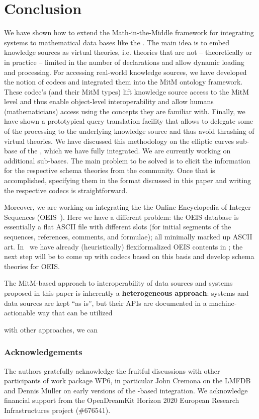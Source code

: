 \section{Conclusion}\label{sec:concl}

We have shown how to extend the Math-in-the-Middle framework for integrating systems to mathematical data bases like the \lmfdb. 
The main idea is to embed knowledge sources as virtual theories, i.e. theories that are not -- theoretically or in practice -- limited in the number of declarations and allow dynamic loading and processing. 
For accessing real-world knowledge sources, we have developed the notion of codecs and integrated them into the MitM ontology framework. 
These codec's (and their MitM types) lift knowledge source access to the MitM level and thus enable object-level interoperability and allow humans (mathematicians) access using the concepts they are familiar with. 
Finally, we have shown a prototypical query translation facility that allows to delegate some of the processing to the underlying knowledge source and thus avoid thrashing of virtual theories. 
We have discussed this methodology on the elliptic curves sub-base of the \lmfdb, which we have fully integrated. 
We are currently working on additional \lmfdb sub-bases. The main problem to be solved is to elicit the information for the respective schema theories from the \lmfdb community. Once that is accomplished, specifying them in the format discussed in this paper and writing the respective codecs is straightforward. 

Moreover, we are working on integrating the the Online Encyclopedia of Integer Sequences (OEIS~\cite{Sloane:OEIS,oeis}). 
Here we have a different problem: the OEIS database is essentially a flat ASCII file with different slots (for initial segments of the sequences, references, comments, and formulae); all minimally marked up ASCII art. 
In~\cite{LuzKoh:fsarfo16} we have already (heuristically) flexiformalized OEIS contents in \ommt; the next step will be to come up with codecs based on this basis and develop schema theories for OEIS.

The MitM-based approach to interoperability of data sources and systems proposed in this paper is inherently a \textbf{heterogeneous approach}: systems and data sources are kept ``as is'', but their APIs are documented in a machine-actionable way that can be utilized 

 with other approaches, we can 

\subsubsection*{Acknowledgements}
The authors gratefully acknowledge the fruitful discussions with other participants of
work package WP6, in particular John Cremona on the LMFDB and Dennis M\"uller on early
versions of the \ommt-based integration. We acknowledge financial support from the
OpenDreamKit Horizon 2020 European Research Infrastructures project (\#676541).


